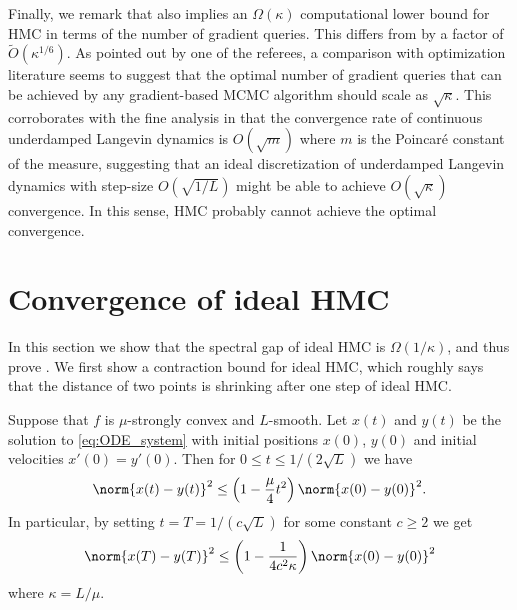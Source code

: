 Finally, we remark that  also implies an $\Omega(\kappa)$ computational lower bound for HMC in terms of the number of gradient queries. 
This differs from \cite{SL19} by a factor of $\tilde{O}(\kappa^{1/6})$. 
As pointed out by one of the referees, 
a comparison with optimization literature seems to suggest that the optimal number of gradient queries that can be achieved by any gradient-based MCMC algorithm should scale as $\sqrt{\kappa}$. 
This corroborates with the fine analysis in \cite{CLW19} that the convergence rate of continuous underdamped Langevin dynamics is $O(\sqrt{m})$ where $m$ is the Poincar\'{e} constant of the measure, 
suggesting that an ideal discretization of underdamped Langevin dynamics with step-size $O(\sqrt{1/L})$ might be able to achieve $O(\sqrt{\kappa})$ convergence. 
In this sense, HMC probably cannot achieve the optimal convergence.



\section{Convergence of ideal HMC}
In this section we show that the spectral gap of ideal HMC is $\Omega(1/\kappa)$, and thus prove . 
We first show a contraction bound for ideal HMC, which roughly says that the distance of two points is shrinking after one step of ideal HMC. 

\begin{lemma}
	\label{lem:HMC_contraction}
	Suppose that $f$ is $\mu$-strongly convex and $L$-smooth. Let $x(t)$ and $y(t)$ be the solution to \eqref{eq:ODE_system} with initial positions $x(0)$, $y(0)$ and initial velocities $x'(0) = y'(0)$. Then for $0\le t \le 1/(2\sqrt{L})$ we have
	\begin{equation}
	\norm{x(t) - y(t)}^2 \le \left( 1 - \frac{\mu}{4} t^2 \right) \norm{x(0) - y(0)}^2.
	\end{equation}
	In particular, by setting $t = T = 1/(c\sqrt{L})$ for some constant $c \ge 2$ we get
	\begin{equation}
	\norm{x(T) - y(T)}^2 \le \left( 1 - \frac{1}{4c^2 \kappa} \right) \norm{x(0) - y(0)}^2
	\end{equation}
	where $\kappa = L/\mu$.
\end{lemma}



